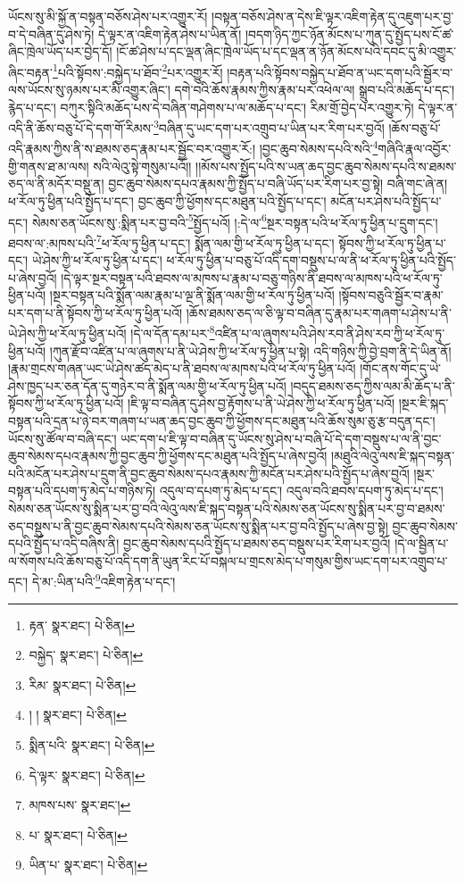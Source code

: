 ཡོངས་སུ་མི་སྐྱོ་ན་བསྟན་བཅོས་ཤེས་པར་འགྱུར་རོ། །བསྟན་བཅོས་ཤེས་ན་དེས་ཇི་ལྟར་འཇིག་རྟེན་དུ་འཇུག་པར་བྱ་བ་དེ་བཞིན་དུ་ཤེས་ཏེ། དེ་ལྟར་ན་འཇིག་རྟེན་ཤེས་པ་ཡིན་ནོ། །བདག་ཉིད་ཀྱང་ཉོན་མོངས་པ་ཀུན་དུ་སྤྱོད་པས་ངོ་ཚ་ཞིང་ཁྲེལ་ཡོད་པར་བྱེད་དོ། །ངོ་ཚ་ཤེས་པ་དང་ལྡན་ཞིང་ཁྲེལ་ཡོད་པ་དང་ལྡན་ན་ཉོན་མོངས་པའི་དབང་དུ་མི་འགྱུར་ཞིང་བརྟན་\footnote{རྟན་  སྣར་ཐང་།  པེ་ཅིན། }པའི་སྟོབས་:བསྐྱེད་པ་ཐོབ་\footnote{བསྐྱེད་  སྣར་ཐང་།  པེ་ཅིན། }པར་འགྱུར་རོ། །བརྟན་པའི་སྟོབས་བསྐྱེད་པ་ཐོབ་ན་ཡང་དག་པའི་སྦྱོར་བ་ལས་ཡོངས་སུ་ཉམས་པར་མི་འགྱུར་ཞིང་། དགེ་བའི་ཆོས་རྣམས་ཀྱིས་རྣམ་པར་འཕེལ་ལ། སྒྲུབ་པའི་མཆོད་པ་དང་། རྙེད་པ་དང་། བཀུར་སྟིའི་མཆོད་པས་དེ་བཞིན་གཤེགས་པ་ལ་མཆོད་པ་དང་། རིམ་གྲོ་བྱེད་པར་འགྱུར་ཏེ། དེ་ལྟར་ན་འདི་ནི་ཆོས་བཅུ་པོ་དེ་དག་གོ་རིམས་\footnote{རིམ་  སྣར་ཐང་།  པེ་ཅིན། }བཞིན་དུ་ཡང་དག་པར་འགྲུབ་པ་ཡིན་པར་རིག་པར་བྱའོ། །ཆོས་བཅུ་པོ་འདི་རྣམས་ཀྱིས་ནི་ས་ཐམས་ཅད་རྣམ་པར་སྦྱོང་བར་འགྱུར་རོ:། །བྱང་ཆུབ་སེམས་དཔའི་སའི་\footnote{། །  སྣར་ཐང་།  པེ་ཅིན། }གཞིའི་རྣལ་འབྱོར་གྱི་གནས་ཐ་མ་ལས། སའི་ལེའུ་སྟེ་གསུམ་པའོ།། །།མོས་པས་སྤྱོད་པའི་ས་ཡན་ཆད་བྱང་ཆུབ་སེམས་དཔའི་ས་ཐམས་ཅད་ལ་ནི་མདོར་བསྡུ་ན། བྱང་ཆུབ་སེམས་དཔའ་རྣམས་ཀྱི་སྤྱོད་པ་བཞི་ཡོད་པར་རིག་པར་བྱ་སྟེ། བཞི་གང་ཞེ་ན། ཕ་རོལ་ཏུ་ཕྱིན་པའི་སྤྱོད་པ་དང་། བྱང་ཆུབ་ཀྱི་ཕྱོགས་དང་མཐུན་པའི་སྤྱོད་པ་དང་། མངོན་པར་ཤེས་པའི་སྤྱོད་པ་དང་། སེམས་ཅན་ཡོངས་སུ་:སྨིན་པར་བྱ་བའི་\footnote{སྨིན་པའི་  སྣར་ཐང་།  པེ་ཅིན། }སྤྱོད་པའོ། །:དེ་ལ་\footnote{དེ་ལྟར་  སྣར་ཐང་།  པེ་ཅིན། }སྔར་བསྟན་པའི་ཕ་རོལ་ཏུ་ཕྱིན་པ་དྲུག་དང་། ཐབས་ལ་:མཁས་པའི་\footnote{མཁས་པས་  སྣར་ཐང་། }ཕ་རོལ་ཏུ་ཕྱིན་པ་དང་། སྨོན་ལམ་གྱི་ཕ་རོལ་ཏུ་ཕྱིན་པ་དང་། སྟོབས་ཀྱི་ཕ་རོལ་ཏུ་ཕྱིན་པ་དང་། ཡེ་ཤེས་ཀྱི་ཕ་རོལ་ཏུ་ཕྱིན་པ་དང་། ཕ་རོལ་ཏུ་ཕྱིན་པ་བཅུ་པོ་འདི་དག་བསྡུས་པ་ལ་ནི་ཕ་རོལ་ཏུ་ཕྱིན་པའི་སྤྱོད་པ་ཞེས་བྱའོ། །དེ་ལྟར་སྔར་བསྟན་པའི་ཐབས་ལ་མཁས་པ་རྣམ་པ་བཅུ་གཉིས་ནི་ཐབས་ལ་མཁས་པའི་ཕ་རོལ་ཏུ་ཕྱིན་པའོ། །སྔར་བསྟན་པའི་སྨོན་ལམ་རྣམ་པ་ལྔ་ནི་སྨོན་ལམ་གྱི་ཕ་རོལ་ཏུ་ཕྱིན་པའོ། །སྟོབས་བཅུའི་སྦྱོར་བ་རྣམ་པར་དག་པ་ནི་སྟོབས་ཀྱི་ཕ་རོལ་ཏུ་ཕྱིན་པའོ། །ཆོས་ཐམས་ཅད་ལ་ཅི་ལྟ་བ་བཞིན་དུ་རྣམ་པར་གཞག་པ་ཤེས་པ་ནི་ཡེ་ཤེས་ཀྱི་ཕ་རོལ་ཏུ་ཕྱིན་པའོ། །དེ་ལ་དོན་དམ་པར་\footnote{པ་  སྣར་ཐང་།  པེ་ཅིན། }འཛིན་པ་ལ་ཞུགས་པའི་ཤེས་རབ་ནི་ཤེས་རབ་ཀྱི་ཕ་རོལ་ཏུ་ཕྱིན་པའོ། །ཀུན་རྫོབ་འཛིན་པ་ལ་ཞུགས་པ་ནི་ཡེ་ཤེས་ཀྱི་ཕ་རོལ་ཏུ་ཕྱིན་པ་སྟེ། འདི་གཉིས་ཀྱི་བྱེ་བྲག་ནི་དེ་ཡིན་ནོ། །རྣམ་གྲངས་གཞན་ཡང་ཡེ་ཤེས་ཚད་མེད་པ་ནི་ཐབས་ལ་མཁས་པའི་ཕ་རོལ་ཏུ་ཕྱིན་པའོ། །གོང་ནས་གོང་དུ་ཡེ་ཤེས་ཁྱད་པར་ཅན་དོན་དུ་གཉེར་བ་ནི་སྨོན་ལམ་གྱི་ཕ་རོལ་ཏུ་ཕྱིན་པའོ། །བདུད་ཐམས་ཅད་ཀྱིས་ལམ་མི་ཆོད་པ་ནི་སྟོབས་ཀྱི་ཕ་རོལ་ཏུ་ཕྱིན་པའོ། །ཇི་ལྟ་བ་བཞིན་དུ་ཤེས་བྱ་རྟོགས་པ་ནི་ཡེ་ཤེས་ཀྱི་ཕ་རོལ་ཏུ་ཕྱིན་པའོ། །སྔར་ཇི་སྐད་བསྟན་པའི་དྲན་པ་ཉེ་བར་གཞག་པ་ཡན་ཆད་བྱང་ཆུབ་ཀྱི་ཕྱོགས་དང་མཐུན་པའི་ཆོས་སུམ་ཅུ་རྩ་བདུན་དང་། ཡོངས་སུ་ཚོལ་བ་བཞི་དང་། ཡང་དག་པ་ཇི་ལྟ་བ་བཞིན་དུ་ཡོངས་སུ་ཤེས་པ་བཞི་པོ་དེ་དག་བསྡུས་པ་ལ་ནི་བྱང་ཆུབ་སེམས་དཔའ་རྣམས་ཀྱི་བྱང་ཆུབ་ཀྱི་ཕྱོགས་དང་མཐུན་པའི་སྤྱོད་པ་ཞེས་བྱའོ། །མཐུའི་ལེའུ་ལས་ཇི་སྐད་བསྟན་པའི་མངོན་པར་ཤེས་པ་དྲུག་ནི་བྱང་ཆུབ་སེམས་དཔའ་རྣམས་ཀྱི་མངོན་པར་ཤེས་པའི་སྤྱོད་པ་ཞེས་བྱའོ། །སྔར་བསྟན་པའི་དཔག་ཏུ་མེད་པ་གཉིས་ཏེ། འདུལ་བ་དཔག་ཏུ་མེད་པ་དང་། འདུལ་བའི་ཐབས་དཔག་ཏུ་མེད་པ་དང་། སེམས་ཅན་ཡོངས་སུ་སྨིན་པར་བྱ་བའི་ལེའུ་ལས་ཇི་སྐད་བསྟན་པའི་སེམས་ཅན་ཡོངས་སུ་སྨིན་པར་བྱ་བ་ཐམས་ཅད་བསྡུས་པ་ནི་བྱང་ཆུབ་སེམས་དཔའི་སེམས་ཅན་ཡོངས་སུ་སྨིན་པར་བྱ་བའི་སྤྱོད་པ་ཞེས་བྱ་སྟེ། བྱང་ཆུབ་སེམས་དཔའི་སྤྱོད་པ་འདི་བཞིས་ནི། བྱང་ཆུབ་སེམས་དཔའི་སྤྱོད་པ་ཐམས་ཅད་བསྡུས་པར་རིག་པར་བྱའོ། །དེ་ལ་སྦྱིན་པ་ལ་སོགས་པའི་ཆོས་བཅུ་པོ་འདི་དག་ནི་ཡུན་རིང་པོ་བསྐལ་པ་གྲངས་མེད་པ་གསུམ་གྱིས་ཡང་དག་པར་འགྲུབ་པ་དང་། དེ་མ་:ཡིན་པའི་\footnote{ཡིན་པ་  སྣར་ཐང་།  པེ་ཅིན། }འཇིག་རྟེན་པ་དང་། 